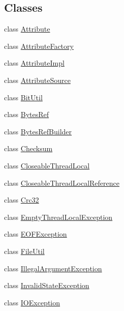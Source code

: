 \subsection*{Classes}
\begin{DoxyCompactItemize}
\item 
class \mbox{\hyperlink{classlucene_1_1core_1_1util_1_1Attribute}{Attribute}}
\item 
class \mbox{\hyperlink{classlucene_1_1core_1_1util_1_1AttributeFactory}{Attribute\+Factory}}
\item 
class \mbox{\hyperlink{classlucene_1_1core_1_1util_1_1AttributeImpl}{Attribute\+Impl}}
\item 
class \mbox{\hyperlink{classlucene_1_1core_1_1util_1_1AttributeSource}{Attribute\+Source}}
\item 
class \mbox{\hyperlink{classlucene_1_1core_1_1util_1_1BitUtil}{Bit\+Util}}
\item 
class \mbox{\hyperlink{classlucene_1_1core_1_1util_1_1BytesRef}{Bytes\+Ref}}
\item 
class \mbox{\hyperlink{classlucene_1_1core_1_1util_1_1BytesRefBuilder}{Bytes\+Ref\+Builder}}
\item 
class \mbox{\hyperlink{classlucene_1_1core_1_1util_1_1Checksum}{Checksum}}
\item 
class \mbox{\hyperlink{classlucene_1_1core_1_1util_1_1CloseableThreadLocal}{Closeable\+Thread\+Local}}
\item 
class \mbox{\hyperlink{classlucene_1_1core_1_1util_1_1CloseableThreadLocalReference}{Closeable\+Thread\+Local\+Reference}}
\item 
class \mbox{\hyperlink{classlucene_1_1core_1_1util_1_1Crc32}{Crc32}}
\item 
class \mbox{\hyperlink{classlucene_1_1core_1_1util_1_1EmptyThreadLocalException}{Empty\+Thread\+Local\+Exception}}
\item 
class \mbox{\hyperlink{classlucene_1_1core_1_1util_1_1EOFException}{E\+O\+F\+Exception}}
\item 
class \mbox{\hyperlink{classlucene_1_1core_1_1util_1_1FileUtil}{File\+Util}}
\item 
class \mbox{\hyperlink{classlucene_1_1core_1_1util_1_1IllegalArgumentException}{Illegal\+Argument\+Exception}}
\item 
class \mbox{\hyperlink{classlucene_1_1core_1_1util_1_1InvalidStateException}{Invalid\+State\+Exception}}
\item 
class \mbox{\hyperlink{classlucene_1_1core_1_1util_1_1IOException}{I\+O\+Exception}}
\item 

\end{DoxyCompactItemize}
